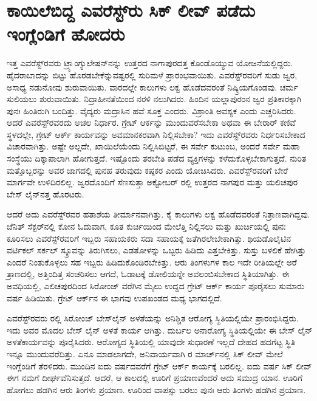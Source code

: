 
\chapter{ಕಾಯಿಲೆಬಿದ್ದ ಎವರೆಸ್ಟ್​ರು ಸಿಕ್​ ಲೀವ್​ ಪಡೆದು ಇಂಗ್ಲೆಂಡಿಗೆ ಹೋದರು}

ಇತ್ತ ಎವರೆಸ್ಟ್​ರವರು ಟ್ರ್ಯಾಂಗ್ಯುಲೇಷನ್​ನನ್ನು ಉತ್ತರದ ನಾಗಾಪುರದತ್ತ ಕೊಂಡೊಯ್ಯುವ ಯೋಜನೆಯಲ್ಲಿದ್ದರು. ಹೈದರಾಬಾದನ್ನು ಬಿಟ್ಟು ಹೊರಡಬೇಕೆನ್ನುವಷ್ಟರಲ್ಲಿ ಸುರಿಮಳೆ ಪ್ರಾರಂಭವಾಯಿತು. ಎವರೆಸ್ಟ್​ರವರಿಗೆ ಸುಡು ಜ್ವರ, ಅಸಾಧ್ಯ ನಡುನೋವು ಶುರುವಾಯಿತು. ವಾರದಲ್ಲೇ ಕಾಲುಗಳು ಲಕ್ವ ಹೊಡೆದವರಂತೆ ನಿಷ್ಕ್ರಿಯಗೊಂಡವು. ಚರ್ಮ ಸುಲಿಯಲು ಶುರುವಾಯಿತು. ನಿದ್ರಾಹೀನತೆಯಿಂದ ನರಳಿ ನಲುಗಿದರು. ಹಿಂದಿನ ಯಲ್ಲಾಪುರಂನ ಜ್ವರ ಪ್ರತಿಕಾರಕ್ಕಾಗಿ ಪುನಃ ಹಿಂತಿರುಗಿ ಬಂದಿತ್ತು. ವೈದ್ಯರು ಮದ್ರಾಸಿನ ಹವೆ ಸೂಕ್ತ ಎಂದರು. ವಿಶ್ರಾಂತಿ ಅವಶ್ಯಕ ಎಂದು ಎಚ್ಚರಿಸಿದರು. ಆದರೆ ಎವರೆಸ್ಟ್​ರವರದು ಅಚಲ ನಿರ್ಧಾರ. ಗ್ರೇಟ್​ ಆರ್ಕನ್ನು ಮುಂದುವರೆಸಬೇಕಾ ಅಥವಾ ಈ ಬೇರಾರ್​ ಕಣಿವೆ ಸ್ಥಳದಲ್ಲೇ, ಗ್ರೇಟ್​ ಆರ್ಕ್ ಕಾರ್ಯವನ್ನು ಅವಮಾನಕರವಾಗಿ ನಿಲ್ಲಿಸಬೇಕಾ? ಇದು ಎವರೆಸ್ಟ್​ರವರು ನಿರ್ಧರಿಸಬೇಕಾದ ವಿಚಾರವಾಗಿತ್ತು. ಅಷ್ಟೇ ಅಲ್ಲದೇ, ಖಾಯಿಲೆಯೆಂದು ನಿಲ್ಲಿಸಿಬಿಟ್ಟರೆ, ಈ ಸರ್ವೇ ಕುಟುಂಬ, ಅಂದರೆ ಸರ್ವೇ ಮಹಾ ಸಂಸ್ಥೆಯು ದಿಕ್ಕಾಪಾಲಾಗಿ ಹೋಗುತ್ತದೆ. ಇಷ್ಟೊಂದು ತರಬೇತಿ ಪಡೆದ ವ್ಯಕ್ತಿಗಳನ್ನು ಕಳೆದುಕೊಳ್ಳಬೇಕಾಗುತ್ತದೆ. ನುರಿತ ಮತ್ತೊಬ್ಬರನ್ನು ಅವರ ಜಾಗದಲ್ಲಿ ಪುನಹ ತರುವುದು ಕಷ್ಠಕರ ಎಂದು ಯೋಚಿಸಿದರು. ಎವರೆಸ್ಟ್​ರವರಿಗೆ ಬೇರೆ ಮಾರ್ಗವೇ ಉಳಿದಿರಲಿಲ್ಲ. ಜ್ವರದೊಂದಿಗೆ ಸೆಣಸುತ್ತಾ ಅಕ್ಟೋಬರ್​ ರಲ್ಲಿ ಉತ್ತರದ ನಾಗಪುರ ಮತ್ತು ಯಲಿಚಪುರ ಬೇಸ್​ ಲೈನ್​ನತ್ತ ಹೊರಟರು.

\newpage

ಆದರೆ ಅದು ಎವರೆಸ್ಟ್​ರವರ ಹತಾಶೆಯ ತೀರ್ಮಾನವಾಗಿತ್ತು. ಕೈ ಕಾಲುಗಳು ಲಕ್ವ ಹೊಡೆದವರಂತೆ ನಿತ್ರಾಣವಾಗಿದ್ದವು. ಜೆನಿತ್​ ಸೆಕ್ಟರ್​ನಲ್ಲಿ ಕೋನ ಓದುವಾಗ, ಕೂತ ಕುರ್ಚಿಯಿಂದ ಮೇಲೆತ್ತಿ ನಿಲ್ಲಿಸಲು ಮತ್ತು ಖುರ್ಚಿಯಲ್ಲಿ ಪುನಃ ಕೂರಿಸಲು ಎವರೆಸ್ಟ್​ರವರಿಗೆ ಇಬ್ಬರು ಸಹಾಯಕರು ಸದಾ ಸಹಾಯಕ್ಕೆ ಜತೆಗಿರಲೇಬೇಕಾಗಿತ್ತು. ಥಿಯಡೊಲೈಟಿನ ವರ್ಟಿಕಲ್​ ಸರ್ಕಲ್​ ಸ್ಕ್ರೂವನ್ನು ತಿರುಗಿಸಲು, ಎಡತೋಳನ್ನು ಒಬ್ಬರು ಹಿಡಿದು ಎತ್ತಬೇಕಿತ್ತು. ಸುಸ್ತು ಬಳಲಿಕೆ ಹೇಗಿತ್ತು ಎಂದರೆ ನಿಂತುಕೊಳ್ಳಲು ಸಹ ಇಬ್ಬರು ಹಿಡಿದುಕೊಂಡಿರಬೇಕಿತ್ತು. ಆರು ತಿಂಗಳುಗಳ ಕಾಲ ಇದೇ ರೀತಿಯಲ್ಲೇ ಅರೆ ತ್ರಾಣದಲ್ಲಿ, ಅತ್ತಿಂದಿತ್ತ ಸಂಚರಿಸಲು ಆಗದೆ, ಓಡಾಟಕ್ಕೆ ಡೋಲಿಯನ್ನೇ ಅವಲಂಬಿಸಬೇಕಾದ ಸ್ಥಿತಿಯಾಗಿತ್ತು. ಈ ಅವಧಿಯಲ್ಲಿ, ಎಲಿಚಪುರದಿಂದ ಸಿರೋಂಜ್​ ವರೆಗಿನ  ಮೈಲು ಉದ್ದದ ಗ್ರೇಟ್​ ಆರ್ಕ್ ಕಾರ್ಯ ಪೂರೈಸಲು ಸುಮಾರು  ವರ್ಷ ಹಿಡಿಯಿತು. ಗ್ರೇಟ್​ ಆರ್ಕ್‌ನ ಈ ಭಾಗವು ಉಪಖಂಡದ ಮಧ್ಯ ಭಾಗದಲ್ಲಿದೆ.

ಎವರೆಸ್ಟ್​ರವರು ರಲ್ಲಿ ಸಿರೋಂಜ್​ ಬೇಸ್​ಲೈನ್​ ಅಳತೆಯನ್ನು ಅನಿಶ್ಚಿತ ಆರೋಗ್ಯ ಸ್ಥಿತಿಯಲ್ಲಿಯೇ ಪ್ರಾರಂಭಿಸಿದ್ದರು. ಇದು ಅವರ ಮೊದಲ ಬೇಸ್​ ಲೈನ್​ ಅಳತೆ ಕಾರ್ಯ ಆಗಿತ್ತು. ದುರ್ಬಲ ಅನಾರೋಗ್ಯ ಸ್ಥಿತಿಯಲ್ಲಿಯೇ ಈ ಬೇಸ್​ ಲೈನ್​ ಅಳತೆಕಾರ್ಯವನ್ನು ಪೂರೈಸಿದರು. ಆರೋಗ್ಯದ ಸ್ಥಿತಿಯಲ್ಲಿ ಯಾವುದೇ ಸುಧಾರಣೆ ಇಲ್ಲದೆ ದೇಹದ ಹದಗೆಟ್ಟ ಸ್ಥಿತಿ ಇನ್ನೂ ಮುಂದುವರೆದಿತ್ತು. ಏನೂ ಮಾಡಲಾಗದೇ, ಅನಿವಾರ್ಯವಾಗಿ ರ ಮಾರ್ಚ್‌ನಲ್ಲಿ ಸಿಕ್​ ಲೀವ್​ ಮೇಲೆ ಇಂಗ್ಲೆಂಡಿಗೆ ತೆರಳಿದರು. ಮುಂದಿನ ಐದು ವರ್ಷದವರೆಗೆ ಗ್ರೇಟ್​ ಆರ್ಕ್ ಕಾರ್ಯಕ್ಕೆ ಬರಲಿಲ್ಲ. ಐದು ವರ್ಷ ಸಿಕ್​ ಲೀವ್​ ಈಗ ನಮಗೆ ದೀರ್ಘವೆನಿಸುತ್ತದೆ. ಆದರೆ, ಆ ಕಾಲದಲ್ಲಿ ಊರಿಗೆ ಪ್ರಯಾಣವೆಂದರೆ ಅದು ಸಮುದ್ರ ಯಾನ. ಊರಿಗೆ ಹೋಗಲು ಹಡಗಿನ ಆರು ತಿಂಗಳು ಪ್ರಯಾಣ. ಊರಿಂದ ವಾಪಸ್ಸು ಬರಲು ಪುನಃ ಆರು ತಿಂಗಳು ಹಡಗಿನ ಪ್ರಯಾಣ.

